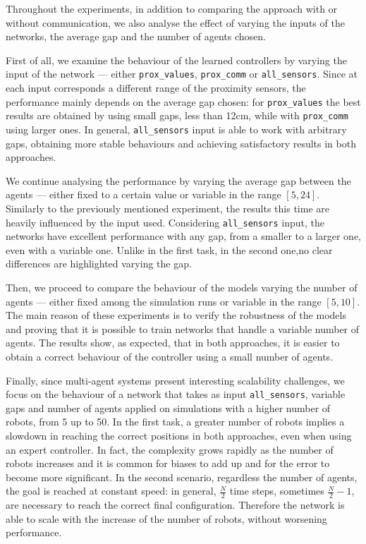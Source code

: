 Throughout the experiments, in addition to comparing the approach with or 
without communication, we also analyse the effect of varying the inputs of the 
networks, the average gap and the number of agents chosen. 

First of all, we examine the behaviour of the learned controllers by varying the 
input of the network — either \texttt{prox\_values}, \texttt{prox\_comm} or 
\texttt{all\_sensors}. Since at each input corresponds a different range of the 
proximity sensors, the performance mainly depends on the average gap chosen: 
for \texttt{prox\_values} the best results are obtained by using small gaps, less 
than 12cm, while with \texttt{prox\_comm} using larger ones. In general, 
\texttt{all\_sensors} input is able to work with arbitrary gaps, obtaining more 
stable behaviours and achieving satisfactory results in both approaches.

We continue analysing the performance by varying the average gap between the 
agents — either fixed to a certain value or variable in the range $[5, 24]$. 
Similarly to the previously mentioned experiment, the results this time are heavily 
influenced by the input used. Considering \texttt{all\_sensors} input, the networks 
have excellent performance with any gap, from a smaller to a larger one, even 
with a variable one. Unlike in the first task, in the second one,no clear differences 
are highlighted varying the gap. 

Then, we proceed to compare the behaviour of the models varying the number of 
agents — either fixed among the simulation runs or variable in the range $[5, 
10]$. The main reason of these experiments is to verify the robustness of the 
models and proving that it is possible to train networks that handle a variable 
number of agents.
The results show, as expected, that in both approaches, it is easier to obtain a 
correct behaviour of the controller using a small number of agents.

Finally, since multi-agent systems present interesting scalability challenges, we 
focus on the behaviour of a network that takes as input \texttt{all\_sensors}, 
variable gaps and number of agents applied on simulations with a higher number 
of robots, from 5 up to 50.
In the first task, a greater number of robots implies a slowdown in reaching the 
correct positions in both approaches, even when using an expert controller. 
In fact, the complexity grows rapidly as the number of robots increases and it is 
common for biases to add up and for the error to become more significant.
In the second scenario, regardless the number of agents, the goal is reached at 
constant speed: in general, $\frac{N}{2}$ time steps, sometimes $\frac{N}{2} - 1$, 
are necessary to reach the correct final configuration. Therefore the network is 
able to scale with the increase of the number of robots, without worsening 
performance.

